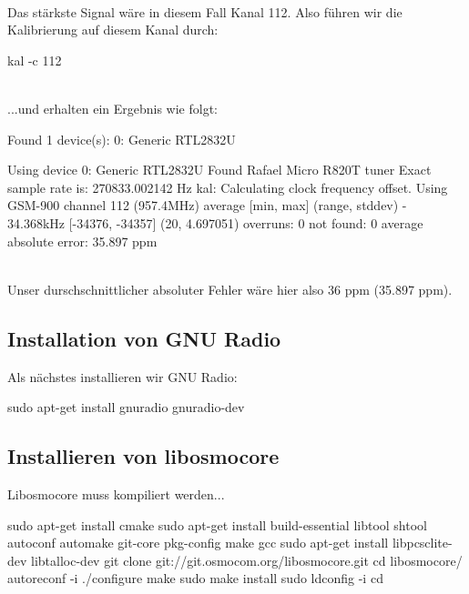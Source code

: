 \noindent\\Das stärkste Signal wäre in diesem Fall Kanal 112. Also führen wir die Kalibrierung auf diesem Kanal durch:

\begin{code}
kal -c 112 
\end{code}

\noindent\\...und erhalten ein Ergebnis wie folgt:

\begin{code}
Found 1 device(s):
  0:  Generic RTL2832U

Using device 0: Generic RTL2832U
Found Rafael Micro R820T tuner
Exact sample rate is: 270833.002142 Hz
kal: Calculating clock frequency offset.
Using GSM-900 channel 112 (957.4MHz)
average		[min, max]	(range, stddev)
- 34.368kHz		[-34376, -34357]	(20, 4.697051)
overruns: 0
not found: 0
average absolute error: 35.897 ppm
\end{code}

\noindent\\Unser durschschnittlicher absoluter Fehler wäre hier also 36 ppm (35.897 ppm).

%
%

\subsection{Installation von GNU Radio}

Als nächstes installieren wir GNU Radio:

\begin{code}
sudo apt-get install gnuradio gnuradio-dev
\end{code}

\subsection{Installieren von libosmocore}

Libosmocore muss kompiliert werden...

\begin{code}[numbers=left, stepnumber=1]
sudo apt-get install cmake
sudo apt-get install build-essential libtool shtool autoconf automake git-core pkg-config make gcc
sudo apt-get install libpcsclite-dev libtalloc-dev
git clone git://git.osmocom.org/libosmocore.git
cd libosmocore/
autoreconf -i
./configure
make
sudo make install
sudo ldconfig -i
cd
\end{code}

